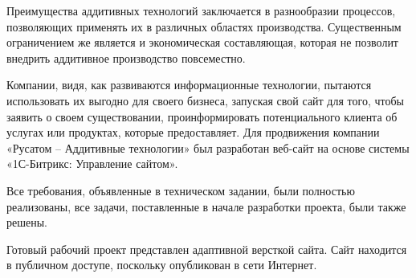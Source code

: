 \newsection
{}

Преимущества аддитивных технологий заключается в разнообразии процессов, позволяющих применять их в различных областях производства. Существенным ограничением же является и экономическая составляющая, которая не позволит внедрить аддитивное производство повсеместно.
  
Компании, видя, как развиваются информационные технологии, пытаются использовать их выгодно для своего бизнеса, запуская свой сайт для того, чтобы заявить о своем существовании, проинформировать потенциального клиента об услугах или продуктах, которые предоставляет. 
Для продвижения компании «Русатом – Аддитивные технологии» был разработан веб-сайт на основе системы «1С-Битрикс: Управление сайтом».

Все требования, объявленные в техническом задании, были полностью реализованы, все задачи, поставленные в начале разработки проекта, были также решены.

Готовый рабочий проект представлен адаптивной версткой сайта. Сайт находится в публичном доступе, поскольку опубликован в сети Интернет.  
